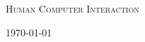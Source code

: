 \begin{titlepage}
  \centering
  {\scshape\Large Human Computer Interaction\par}
  \vspace{1.5cm}
  {\huge\bfseries \doctitle\par}
  \vspace{2cm}
  {\Large\itshape \docauthor\par}
  \vfill

  {\large \today\par}
\end{titlepage}

